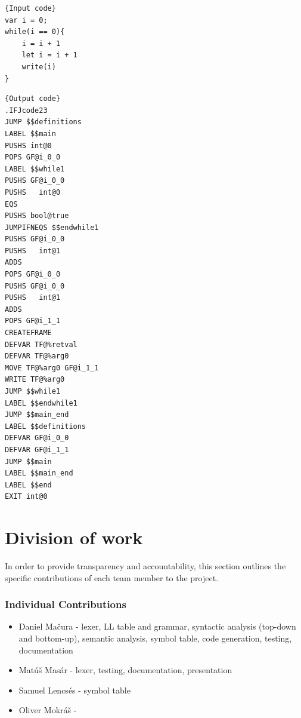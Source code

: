 \documentclass[11pt]{article}
\begin{document}
\noindent\begin{minipage}{.45\textwidth}
\label{Code example}
\begin{lstlisting}[style=PseudoStyle, caption=Input code,frame=tlrb, label={Input code}]{Input code}
var i = 0;
while(i == 0){
    i = i + 1
    let i = i + 1
    write(i)
}

\end{lstlisting}
\end{minipage}\hfill
\begin{minipage}{.45\textwidth}
\begin{lstlisting}[style=PseudoStyle, caption=Generated code,frame=tlrb, label={Output code}]{Output code}
.IFJcode23
JUMP $$definitions
LABEL $$main
PUSHS int@0
POPS GF@i_0_0
LABEL $$while1
PUSHS GF@i_0_0
PUSHS   int@0
EQS
PUSHS bool@true
JUMPIFNEQS $$endwhile1
PUSHS GF@i_0_0
PUSHS   int@1
ADDS
POPS GF@i_0_0
PUSHS GF@i_0_0
PUSHS   int@1
ADDS
POPS GF@i_1_1
CREATEFRAME
DEFVAR TF@%retval
DEFVAR TF@%arg0
MOVE TF@%arg0 GF@i_1_1
WRITE TF@%arg0
JUMP $$while1
LABEL $$endwhile1
JUMP $$main_end
LABEL $$definitions
DEFVAR GF@i_0_0
DEFVAR GF@i_1_1
JUMP $$main
LABEL $$main_end
LABEL $$end
EXIT int@0
\end{lstlisting}
\end{minipage}




\newpage 
\part{Division of work}
In order to provide transparency and accountability, this section outlines the specific contributions of each team member to the project.
\section{Individual Contributions}

\begin{itemize}
\item Daniel Mačura - lexer, LL table and grammar, syntactic analysis (top-down and bottom-up), semantic analysis, symbol table, code generation, testing, documentation

\item Matúš Masár - lexer, testing, documentation, presentation

\item Samuel Lencsés - symbol table

\item Oliver Mokráš - 
\end{itemize}

\newpage


\end{document}
